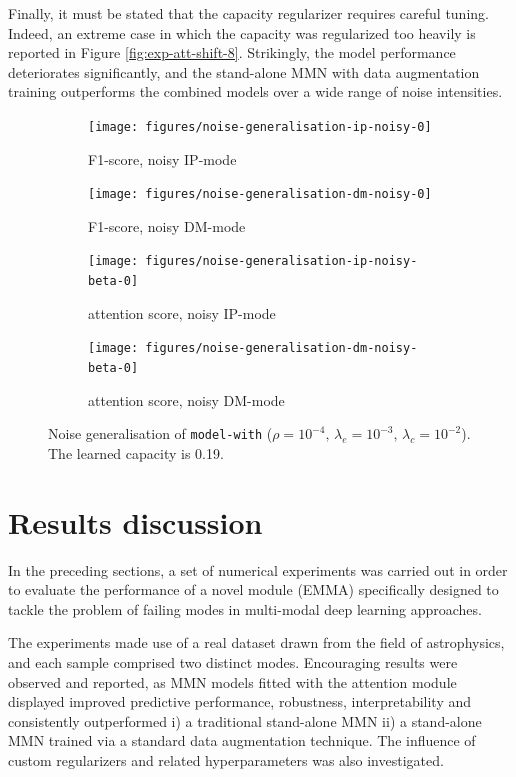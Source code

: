 Finally, it must be stated that the capacity regularizer requires careful tuning. Indeed, an extreme case in which the capacity was regularized too heavily is reported in Figure \ref{fig:exp-att-shift-8}. Strikingly, the model performance deteriorates significantly, and the stand-alone MMN with data augmentation training outperforms the combined models over a wide range of noise intensities. 
\begin{figure}[!h]
\centering
\begin{subfigure}{.5\textwidth}
  \centering
  \texttt{[image: figures/noise-generalisation-ip-noisy-0]}
  \caption{F1-score, noisy IP-mode}
  \label{fig:exp-att-shift-6-a}
\end{subfigure}%
\begin{subfigure}{.5\textwidth}
  \centering
  \texttt{[image: figures/noise-generalisation-dm-noisy-0]}
  \caption{F1-score, noisy DM-mode}
 \label{fig:exp-att-shift-6-b} 
\end{subfigure}
\begin{subfigure}{.5\textwidth}
  \centering
  \texttt{[image: figures/noise-generalisation-ip-noisy-beta-0]}
  \caption{attention score, noisy IP-mode}
   \label{fig:exp-att-shift-6-c} 
\end{subfigure}%
\begin{subfigure}{.5\textwidth}
  \centering
  \texttt{[image: figures/noise-generalisation-dm-noisy-beta-0]}
  \caption{attention score, noisy DM-mode}
   \label{fig:exp-att-shift-6-d} 
\end{subfigure}
\caption[Noise generalisation]{Noise generalisation of \texttt{model-with} ($\rho=10^{-4},\,\lambda_e=10^{-3},\,\lambda_c=10^{-2}$). The learned capacity is 0.19.}
\label{fig:exp-att-shift-6}
\end{figure}


\section{Results discussion}
In the preceding sections, a set of numerical experiments was carried out in order to evaluate the performance of a novel module (EMMA) specifically designed to tackle the problem of failing modes in multi-modal deep learning approaches.

The experiments made use of a real dataset drawn from the field of astrophysics, and each sample comprised two distinct modes. Encouraging results were observed and reported, as MMN models fitted with the attention module displayed improved predictive performance, robustness, interpretability and consistently outperformed i) a traditional stand-alone MMN ii) a stand-alone MMN trained via a standard data augmentation technique. The influence of custom regularizers and related hyperparameters was also investigated.

